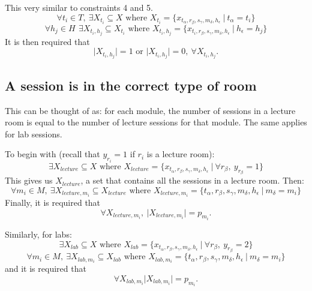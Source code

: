 This very similar to constraints 4 and 5.
\begin{equation*}
	\forall t_i \in T, \: \exists X_{t_i} \subseteq X \text{ where } X_{t_i} = 
	\{ x_{t_{\alpha},r_{\beta},s_{\gamma},m_{\delta},h_{\epsilon}} \: | \: 
	t_{\alpha} = t_i\}
\end{equation*}
\begin{equation*}
	\forall h_j \in H\, \: \exists X_{t_i,h_j} \subseteq X_{t_i} \text{ where }
	X_{t_i,h_j} = \{ x_{t_i, r_{\beta}, s_{\gamma}, m_{\delta}, h_{\epsilon}} 
	\: | \: h_{\epsilon} = h_j \}
\end{equation*}
It is then required that
\begin{equation*}
	\lvert X_{t_i,h_j} \rvert = 1 \text{ or } \lvert X_{t_i,h_j} \rvert = 0, \: 
	\forall X_{t_i,h_j}.
\end{equation*}

\subsection{A session is in the correct type of room}

This can be thought of as: for each module, the number of sessions in a lecture 
room is equal to the number of lecture sessions for that module. The same 
applies for lab sessions.

To begin with (recall that \( y_{r_i} = 1 \) if \( r_i \) is a lecture room):
\begin{equation*}
	\exists X_{lecture} \subseteq X \text{ where } X_{lecture} = \{ 
	x_{t_{\alpha}, r_{\beta},s_{\gamma},m_{\delta},h_{\epsilon}} \: | \: \forall 
	r_{\beta}, \: y_{r_{\beta}} = 1\}
\end{equation*}
This gives us \( X_{lecture} \), a set that contains all the sessions in a 
lecture room. Then:
\begin{equation*}
	\forall m_i \in M, \: \exists X_{lecture,m_i} \subseteq X_{lecture} 
	\text{ where } X_{lecture,m_i} = \{ t_{\alpha},r_{\beta},s_{\gamma},
	m_{\delta},h_{\epsilon} \: | \: m_{\delta} = m_i\}
\end{equation*}
Finally, it is required that
\begin{equation*}
	\forall X_{lecture,m_i}, \: \lvert X_{lecture,m_i} \rvert = p_{m_i}.
\end{equation*}

Similarly, for labs:
\begin{equation*}
	\exists X_{lab} \subseteq X \text{ where } X_{lab} = \{ x_{t_{\alpha}, 
	r_{\beta},s_{\gamma},m_{\delta},h_{\epsilon}} \: | \: \forall r_{\beta}, \: 
	y_{r_{\beta}} = 2\}
\end{equation*}
\begin{equation*}
	\forall m_i \in M, \: \exists X_{lab,m_i} \subseteq X_{lab} \text{ where } 
	X_{lab,m_i} = \{ t_{\alpha},r_{\beta},s_{\gamma},m_{\delta},h_{\epsilon} \:
	| \: m_{\delta} = m_i\}
\end{equation*}
and it is required that
\begin{equation*}
	\forall X_{lab,m_i} \lvert X_{lab,m_i} \rvert = p_{m_i}.
\end{equation*}

